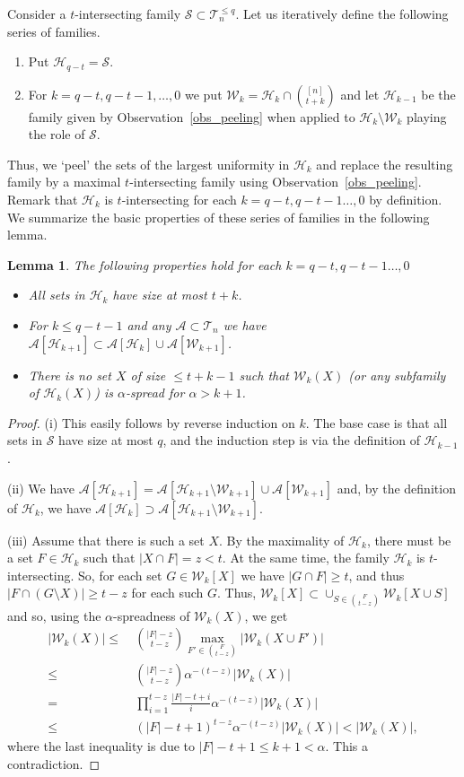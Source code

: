 \documentclass[11pt,letterpaper]{amsart}
\renewcommand{\le}{\leqslant}
\renewcommand{\ge}{\geqslant}
\newcommand{\s}{\mathcal{S}}
\newcommand{\aaa}{\mathcal{A}}
\newcommand{\h}{\mathcal H}
\newcommand{\T}{\mathcal{T}}
\newcommand{\W}{\mathcal{W}}
\newtheorem{lemma}[theorem]{Lemma}
\begin{document}
Consider a $t$-intersecting family $\s\subset \T^{\le q}_n$. Let us iteratively define the following series of families.
\begin{enumerate}
    \item Put $\h_{q-t}=\s$.
    \item For $k = q-t,q-t-1, \ldots, 0$ we put $\W_k = \h_k \cap {[n] \choose t+k}$ and let $\h_{k-1}$ be the family given by Observation~\ref{obs_peeling} when applied to $\h_{k}\setminus \W_{k}$ playing the role of $\mathcal S$.
\end{enumerate}
Thus, we `peel' the sets of the largest uniformity in $\h_k$ and replace the resulting family by a maximal $t$-intersecting family using Observation~\ref{obs_peeling}.  Remark that $\h_k$ is $t$-intersecting for each $k=q-t,q-t-1\ldots,0$ by definition. We summarize the basic properties of these series of families in the following lemma.


\begin{lemma}\label{lemma_peel} The following properties hold for each $k = q-t,q-t-1\ldots, 0$
\begin{itemize}
  \item[(i)] All sets  in $\h_k$ have size at most $t+k$.
  \item[(ii)] For $k\le q-t-1$ and any $\aaa \subset \T_n$ we have $\aaa[\h_{k+1}]\subset \aaa[\h_{k}]\cup \aaa[\W_{k+1}]$.
  \item[(iii)] There is no set $X$ of size $\le t+k-1$
      such that $\W_k(X)$ (or any subfamily of $\h_k(X)$) is $\alpha$-spread for $\alpha>k + 1$. 
\end{itemize}
\end{lemma}
\begin{proof}
(i) This easily follows by reverse induction on $k$. The base case is that all sets in $\s$ have size at most $q$, and the induction step is via the definition of $\h_{k-1}$.

(ii) We have $\aaa[\h_{k+1}] = \aaa[\h_{k+1} \setminus \W_{k+1}] \cup \aaa[\W_{k+1}]$ and, by the definition of $\h_{k}$, we have $\aaa[\h_k]\supset \aaa[\h_{k+1}\setminus \W_{k+1}]$.

(iii) Assume that there is such a set $X$. By the maximality of $\h_k$, there must be a set $F\in \h_k$ such that $|X\cap F|=z<t$.
At the same time, the family $\h_k$ is  $t$-intersecting. So, for each set  $G\in \W_k[X]$ we have $|G\cap F|\ge t$, and thus $|F\cap (G\setminus X)| \ge t-z$ for each such $G$. Thus, $\W_k[X]\subset \cup_{S\in {F\choose t-z}}\W_k[X\cup S]$ and so, using the $\alpha$-spreadness of $\W_k(X)$, we get \begin{align*}|\W_k(X)|\le&\ {|F|-z\choose t-z}\max_{F'\in {F\choose t-z}}|\W_k(X\cup F')|\\
\le&\ {|F|-z\choose t-z}\alpha^{-(t-z)}|\W_k(X)| \\
=&\ \prod_{i=1}^{t-z}\frac{|F|-t+i}i\alpha^{-(t-z)}|\W_k(X)|\\
\le&\ (|F|-t+1)^{t-z}\alpha^{-(t-z)}|\W_k(X)|<|\W_k(X)|,\end{align*}
where the last inequality is due to $|F|-t+1\le k + 1<\alpha$. This a contradiction.
\end{proof}
\end{document}
